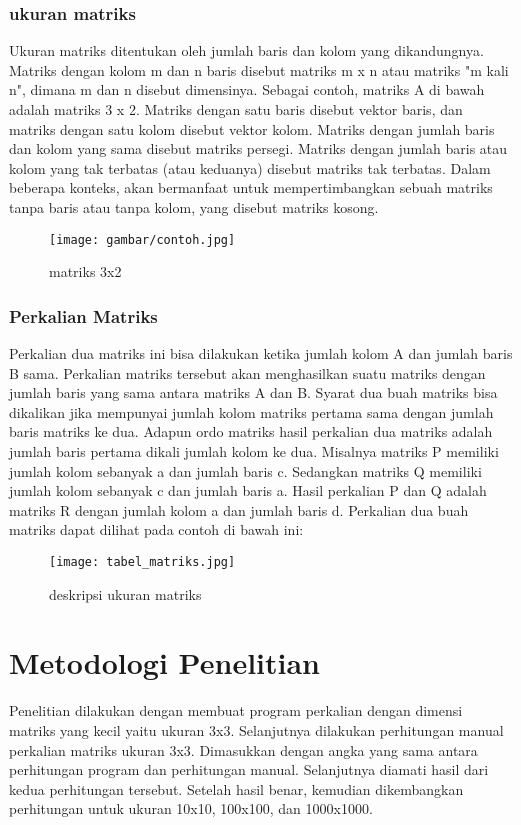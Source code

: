 \documentclass[conference]{IEEEtran}
\begin{document}
\subsubsection{ukuran matriks}
Ukuran matriks ditentukan oleh jumlah baris dan kolom yang dikandungnya. Matriks dengan kolom m dan n baris disebut matriks m x n atau matriks "m kali n", dimana m dan n disebut dimensinya. Sebagai contoh, matriks A di bawah adalah matriks 3 x 2. Matriks dengan satu baris disebut vektor baris, dan matriks dengan satu kolom disebut vektor kolom. Matriks dengan jumlah baris dan kolom yang sama disebut matriks persegi. Matriks dengan jumlah baris atau kolom yang tak terbatas (atau keduanya) disebut matriks tak terbatas. Dalam beberapa konteks, akan bermanfaat untuk mempertimbangkan sebuah matriks tanpa baris atau tanpa kolom, yang disebut matriks kosong.

\begin{figure}[htbp]
    \texttt{[image: gambar/contoh.jpg]}
    \centering
    \caption{matriks 3x2}   
\end{figure}

\subsubsection{Perkalian Matriks}
Perkalian dua matriks ini bisa dilakukan ketika jumlah kolom A dan jumlah baris B sama. Perkalian matriks tersebut akan menghasilkan suatu matriks dengan jumlah baris yang sama antara matriks A dan B. Syarat dua buah matriks bisa dikalikan jika mempunyai jumlah kolom matriks pertama sama dengan jumlah baris matriks ke dua. Adapun ordo matriks hasil perkalian dua matriks adalah jumlah baris pertama dikali jumlah kolom ke dua.
Misalnya matriks P memiliki jumlah kolom sebanyak a dan jumlah baris c. Sedangkan matriks Q memiliki jumlah kolom sebanyak c dan jumlah baris a. Hasil perkalian P dan Q adalah matriks R dengan jumlah kolom a dan jumlah baris d.
Perkalian dua buah matriks dapat dilihat pada contoh di bawah ini:
\begin{figure}[htbp]
    \texttt{[image: tabel\_matriks.jpg]}
    \centering
    \caption{deskripsi ukuran matriks}        
\end{figure}


\section{Metodologi Penelitian}
Penelitian dilakukan dengan membuat program perkalian dengan dimensi matriks 
yang kecil yaitu ukuran 3x3. Selanjutnya dilakukan perhitungan manual perkalian
 matriks ukuran 3x3. Dimasukkan dengan angka yang sama antara perhitungan program
  dan perhitungan manual. Selanjutnya diamati hasil dari kedua perhitungan
   tersebut. Setelah hasil benar, kemudian dikembangkan perhitungan untuk 
   ukuran 10x10, 100x100, dan 1000x1000.
\end{document}
